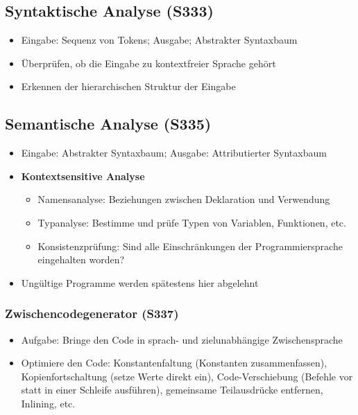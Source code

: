 \subsection{Syntaktische Analyse (S333)}
\begin{itemize}
	\item Eingabe: Sequenz von Tokens; Ausgabe; Abstrakter Syntaxbaum
	\item Überprüfen, ob die Eingabe zu kontextfreier Sprache gehört
	\item Erkennen der hierarchischen Struktur der Eingabe
\end{itemize}

\subsection{Semantische Analyse (S335)}
\begin{itemize}
	\item Eingabe: Abstrakter Syntaxbaum; Ausgabe: Attributierter Syntaxbaum
	\item \textbf{Kontextsensitive Analyse}
	\begin{itemize}
		\item Namensanalyse: Beziehungen zwischen Deklaration und Verwendung
		\item Typanalyse: Bestimme und prüfe Typen von Variablen, Funktionen, etc.
		\item Konsistenzprüfung: Sind alle Einschränkungen der Programmiersprache eingehalten worden?
	\end{itemize}
	\item Ungültige Programme werden spätestens hier abgelehnt
\end{itemize}

\subsubsection{Zwischencodegenerator (S337)}
\begin{itemize}
	\item Aufgabe: Bringe den Code in sprach- und zielunabhängige Zwischensprache
	\item Optimiere den Code: Konstantenfaltung (Konstanten zusammenfassen), Kopienfortschaltung (setze Werte direkt ein), Code-Verschiebung (Befehle vor statt in einer Schleife ausführen), gemeinsame Teilausdrücke entfernen, Inlining, etc.
\end{itemize}

